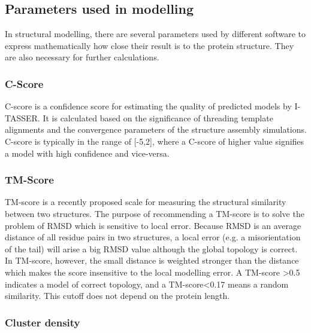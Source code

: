\documentclass[11pt, letterpaper, english]{article}
\begin{document}
    
    
    

\subsection{Parameters used in modelling} %

    \par{In structural modelling, there are several parameters used by different software to express mathematically how close their result is to the protein structure. They are also necessary for further calculations.}

\subsubsection{C-Score}

    \par{C-score is a confidence score for estimating the quality of predicted models by I-TASSER. It is calculated based on the significance of threading template alignments and the convergence parameters of the structure assembly simulations. C-score is typically in the range of [-5,2], where a C-score of higher value signifies a model with high confidence and vice-versa.}

\subsubsection{TM-Score}

    \par{TM-score is a recently proposed scale for measuring the structural similarity between two structures. The purpose of recommending a TM-score is to solve the problem of RMSD which is sensitive to local error. Because RMSD is an average distance of all residue pairs in two structures, a local error (e.g. a misorientation of the tail) will arise a big RMSD value although the global topology is correct. In TM-score, however, the small distance is weighted stronger than the distance which makes the score insensitive to the local modelling error. A TM-score >0.5 indicates a model of correct topology, and a TM-score<0.17 means a random similarity. This cutoff does not depend on the protein length.}

\subsubsection{Cluster density}
\end{document}
